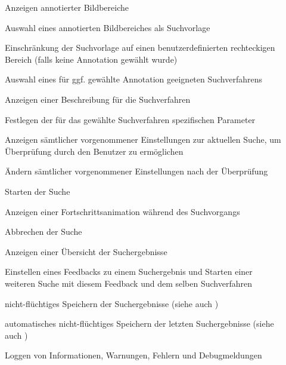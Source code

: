 \begin{description}
	\item[] Anzeigen annotierter Bildbereiche
	\item[] Auswahl eines annotierten Bildbereiches als Suchvorlage
	\item[] Einschränkung der Suchvorlage auf einen benutzerdefinierten rechteckigen Bereich (falls keine Annotation gewählt wurde)
	\item[] Auswahl eines für ggf. gewählte Annotation geeigneten Suchverfahrens
	\item[] Anzeigen einer Beschreibung für die Suchverfahren
	\item[] Festlegen der für das gewählte Suchverfahren spezifischen Parameter
	\item[] Anzeigen sämtlicher vorgenommener Einstellungen zur aktuellen Suche, um Überprüfung durch den Benutzer zu ermöglichen
	\item[] Ändern sämtlicher vorgenommener Einstellungen nach der Überprüfung
	\newline
	\item[] Starten der Suche
	\item[] Anzeigen einer Fortschrittsanimation während des Suchvorgangs
	\item[] Abbrechen der Suche
	\newline
	\item[] Anzeigen einer \"Ubersicht der Suchergebnisse  
	\item[] Einstellen eines Feedbacks zu einem Suchergebnis und Starten einer weiteren Suche mit diesem Feedback und dem selben Suchverfahren
	\item[] nicht-flüchtiges Speichern der Suchergebnisse (siehe auch )
	\item[] automatisches nicht-flüchtiges Speichern der letzten Suchergebnisse (siehe auch )
	\item[] Loggen von Informationen, Warnungen, Fehlern und Debugmeldungen
	 
\end{description}

